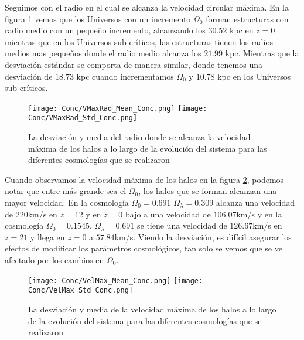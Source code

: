 {\morado Seguimos con el radio en el cual se alcanza la velocidad circular máxima. En la figura} \ref{fig:Conc_VMaxRad} vemos que los Universos con un incremento $\Omega_0$ forman estructuras con radio medio con un pequeño incremento, alcanzando los $30.52$ kpc en $z=0$ mientras que en los Universos sub-críticos, las estructuras tienen los radios medios mas pequeños donde el radio medio alcanza los $21.99$ kpc. Mientras que la desviación estándar se comporta de manera similar, donde tenemos una desviación de $18.73$ kpc cuando incrementamos $\Omega_0$ y $10.78$ kpc en los Universos sub-críticos.

\begin{figure}[H]
      \centering
      \texttt{[image: Conc/VMaxRad\_Mean\_Conc.png]}
      \texttt{[image: Conc/VMaxRad\_Std\_Conc.png]}
      \caption[Evolución de la desviación y media del radio donde se alcanza la velocidad circular máxima de los halos para todas las cosmologías]{La desviación y media del radio donde se alcanza la velocidad máxima de los halos a lo largo de la evolución del sistema para las diferentes cosmologías que se realizaron}
      \label{fig:Conc_VMaxRad}
\end{figure}

Cuando observamos la velocidad máxima de los halos en la figura \ref{fig:Conc_VelMax}, podemos notar que entre más grande sea el $\Omega_0$, los halos que se forman alcanzan una mayor velocidad. En la cosmología $\Omega_0 = 0.691$ $\Omega_\lambda = 0.309$ alcanza una velocidad de $220$km/s en $z=12$ y en $z=0$ bajo a una velocidad de $106.07$km/s y en la cosmología  $\Omega_0 = 0.1545$, $\Omega_\lambda = 0.691$ se tiene una velocidad de $126.67$km/s en $z=21$ y llega en $z=0$ a $57.84$km/s. Viendo la desviación, es difícil asegurar los efectos de modificar los parámetros cosmológicos, tan solo se vemos que se ve afectado por los cambios en $\Omega_0$.

\begin{figure}[H]
      \centering
      \texttt{[image: Conc/VelMax\_Mean\_Conc.png]}
      \texttt{[image: Conc/VelMax\_Std\_Conc.png]}
      \caption[Evolución de la desviación y media de la velocidad máxima de los halos para todas las cosmologías]{La desviación y media de la velocidad máxima de los halos a lo largo de la evolución del sistema para las diferentes cosmologías que se realizaron}
      \label{fig:Conc_VelMax}
\end{figure}

